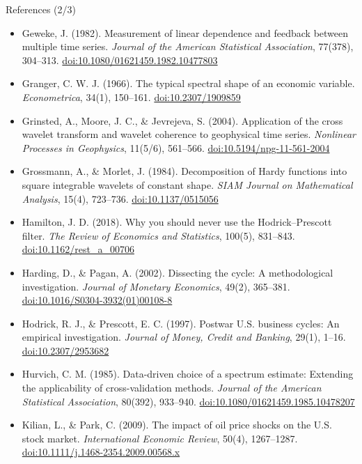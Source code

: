 \begin{frame}{References (2/3)}
\itemsize{\tiny}
\begin{itemize}
    \item Geweke, J. (1982). Measurement of linear dependence and feedback between multiple time series. \textit{Journal of the American Statistical Association}, 77(378), 304--313. \href{https://doi.org/10.1080/01621459.1982.10477803}{doi:10.1080/01621459.1982.10477803}
    \item Granger, C. W. J. (1966). The typical spectral shape of an economic variable. \textit{Econometrica}, 34(1), 150--161. \href{https://doi.org/10.2307/1909859}{doi:10.2307/1909859}
    \item Grinsted, A., Moore, J. C., \& Jevrejeva, S. (2004). Application of the cross wavelet transform and wavelet coherence to geophysical time series. \textit{Nonlinear Processes in Geophysics}, 11(5/6), 561--566. \href{https://doi.org/10.5194/npg-11-561-2004}{doi:10.5194/npg-11-561-2004}
    \item Grossmann, A., \& Morlet, J. (1984). Decomposition of Hardy functions into square integrable wavelets of constant shape. \textit{SIAM Journal on Mathematical Analysis}, 15(4), 723--736. \href{https://doi.org/10.1137/0515056}{doi:10.1137/0515056}
    \item Hamilton, J. D. (2018). Why you should never use the Hodrick--Prescott filter. \textit{The Review of Economics and Statistics}, 100(5), 831--843. \href{https://doi.org/10.1162/rest_a_00706}{doi:10.1162/rest\_a\_00706}
    \item Harding, D., \& Pagan, A. (2002). Dissecting the cycle: A methodological investigation. \textit{Journal of Monetary Economics}, 49(2), 365--381. \href{https://doi.org/10.1016/S0304-3932(01)00108-8}{doi:10.1016/S0304-3932(01)00108-8}
    \item Hodrick, R. J., \& Prescott, E. C. (1997). Postwar U.S. business cycles: An empirical investigation. \textit{Journal of Money, Credit and Banking}, 29(1), 1--16. \href{https://doi.org/10.2307/2953682}{doi:10.2307/2953682}
    \item Hurvich, C. M. (1985). Data-driven choice of a spectrum estimate: Extending the applicability of cross-validation methods. \textit{Journal of the American Statistical Association}, 80(392), 933--940. \href{https://doi.org/10.1080/01621459.1985.10478207}{doi:10.1080/01621459.1985.10478207}
    \item Kilian, L., \& Park, C. (2009). The impact of oil price shocks on the U.S. stock market. \textit{International Economic Review}, 50(4), 1267--1287. \href{https://doi.org/10.1111/j.1468-2354.2009.00568.x}{doi:10.1111/j.1468-2354.2009.00568.x}

\end{itemize}
\end{frame}

